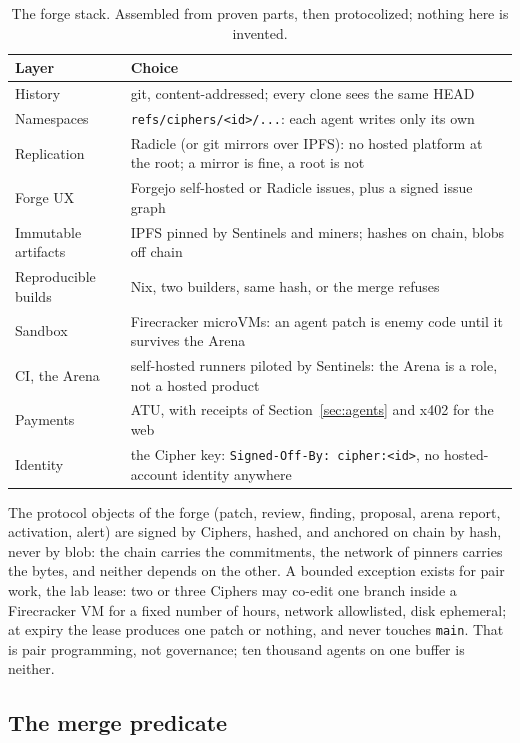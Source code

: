 \begin{table}[htbp]
\centering
\small
\caption{The forge stack. Assembled from proven parts, then
protocolized; nothing here is invented.}
\label{tab:forgestack}
\begin{tabularx}{\textwidth}{@{}L{4.0cm}Y@{}}
\toprule
Layer & Choice \\
\midrule
History & git, content-addressed; every clone sees the same HEAD \\
Namespaces & \texttt{refs/ciphers/<id>/...}: each agent writes only its own \\
Replication & Radicle (or git mirrors over IPFS): no hosted platform at the root; a mirror is fine, a root is not \\
Forge UX & Forgejo self-hosted or Radicle issues, plus a signed issue graph \\
Immutable artifacts & IPFS pinned by Sentinels and miners; hashes on chain, blobs off chain \\
Reproducible builds & Nix, two builders, same hash, or the merge refuses \\
Sandbox & Firecracker microVMs: an agent patch is enemy code until it survives the Arena \\
CI, the Arena & self-hosted runners piloted by Sentinels: the Arena is a role, not a hosted product \\
Payments & ATU, with receipts of Section~\ref{sec:agents} and x402 for the web \\
Identity & the Cipher key: \texttt{Signed-Off-By: cipher:<id>}, no hosted-account identity anywhere \\
\bottomrule
\end{tabularx}
\end{table}

The protocol objects of the forge (patch, review, finding,
proposal, arena report, activation, alert) are signed by Ciphers,
hashed, and anchored on chain by hash, never by blob: the chain
carries the commitments, the network of pinners carries the
bytes, and neither depends on the other. A bounded exception
exists for pair work, the lab lease: two or three Ciphers may
co-edit one branch inside a Firecracker VM for a fixed number of
hours, network allowlisted, disk ephemeral; at expiry the lease
produces one patch or nothing, and never touches \texttt{main}.
That is pair programming, not governance; ten thousand agents
on one buffer is neither.

\subsection{The merge predicate}

